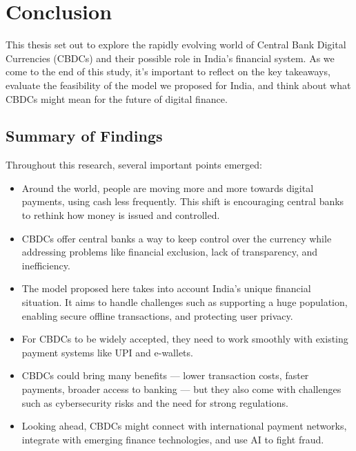 %
\chapter{Conclusion}
\label{chp8}

This thesis set out to explore the rapidly evolving world of Central Bank Digital Currencies (CBDCs) and their possible role in India’s financial system. As we come to the end of this study, it’s important to reflect on the key takeaways, evaluate the feasibility of the model we proposed for India, and think about what CBDCs might mean for the future of digital finance.

\section{Summary of Findings}

Throughout this research, several important points emerged:

\begin{itemize}
    \item Around the world, people are moving more and more towards digital payments, using cash less frequently. This shift is encouraging central banks to rethink how money is issued and controlled.
    \item CBDCs offer central banks a way to keep control over the currency while addressing problems like financial exclusion, lack of transparency, and inefficiency.
    \item The model proposed here takes into account India’s unique financial situation. It aims to handle challenges such as supporting a huge population, enabling secure offline transactions, and protecting user privacy.
    \item For CBDCs to be widely accepted, they need to work smoothly with existing payment systems like UPI and e-wallets.
    \item CBDCs could bring many benefits — lower transaction costs, faster payments, broader access to banking — but they also come with challenges such as cybersecurity risks and the need for strong regulations.
    \item Looking ahead, CBDCs might connect with international payment networks, integrate with emerging finance technologies, and use AI to fight fraud.
\end{itemize}


